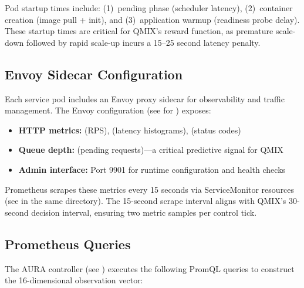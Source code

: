 \documentclass[conference]{IEEEtran}
\begin{document}
Pod startup times include: (1)~pending phase (scheduler latency),
(2)~container creation (image pull + init), and (3)~application warmup
(readiness probe delay). These startup times are critical for QMIX's
reward function, as premature scale-down followed by rapid scale-up
incurs a 15--25 second latency penalty.

\subsection{Envoy Sidecar Configuration}

Each service pod includes an Envoy proxy sidecar for observability and
traffic management. The Envoy configuration (see
 for )
exposes:

\begin{itemize}
\item \textbf{HTTP metrics:} 
  (RPS),  (latency
  histograms),  (status codes)
\item \textbf{Queue depth:} 
  (pending requests)---a critical predictive signal for QMIX
\item \textbf{Admin interface:} Port 9901 for runtime configuration and
  health checks
\end{itemize}

Prometheus scrapes these metrics every 15 seconds via ServiceMonitor
resources (see  in the same directory).
The 15-second scrape interval aligns with QMIX's 30-second decision
interval, ensuring two metric samples per control tick.

\subsection{Prometheus Queries}

The AURA controller (see )
executes the following PromQL queries to construct the 16-dimensional
observation vector:
\end{document}
